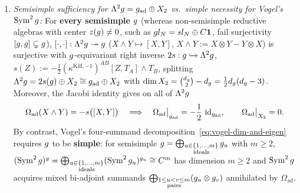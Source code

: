 \begin{proposition}[{Proof of $C_2(V\otimes W) = C_2(V)\otimes\id + \id\otimes C_2(W) + 2\Omega_{V\otimes W}$, semisimple vs.\ simple hypotheses on $X_2$, and Jacobi vanishing $\Omega_{\mathrm{ad}}|_{X_2} = 0$}]
\begin{enumerate}[label=(\arabic*),leftmargin=*]
  \item \emph{Semisimple sufficiency for $\Lambda^2g = g_{\mathrm{ad}}\oplus X_2$ vs.\ simple necessity for Vogel's $\operatorname{Sym}^2g$:} For \textbf{every semisimple} $g$ (whereas non-semisimple reductive algebras with center $z(g) \neq 0$, such as $gl_N = sl_N\oplus C\mathbf{1}$, fail surjectivity $[g,g]\subsetneq g$), $[\cdot,\cdot] : \Lambda^2g \twoheadrightarrow g$ ($X\wedge Y \mapsto [X,Y]$, $X\wedge Y := X\otimes Y - Y\otimes X$) is surjective with $g$-equivariant right inverse $2s : g \hookrightarrow \Lambda^2g$, $s(Z) := -\frac{1}{2}(\kappa^{\mathrm{Kill},-1})^{AB}[Z,T_A]\wedge T_B$, splitting $\Lambda^2g = 2s(g)\oplus X_2 \cong g_{\mathrm{ad}}\oplus X_2$ with $\dim X_2 = \binom{d_{g}}{2} - d_{g} = \frac{1}{2}d_{g}(d_{g}-3)$. Moreover, the Jacobi identity gives on all of $\Lambda^2g$
  \begin{equation}
  \label{eq:omega-on-wedge2}
  \Omega_{\mathrm{ad}}(X\wedge Y) = -s\bigl([X,Y]\bigr)
  \quad\Longrightarrow\quad
  \Omega_{\mathrm{ad}}\big|_{g_{\mathrm{ad}}} = -\frac{1}{2}\,\operatorname{id}_{g_{\mathrm{ad}}},\qquad
  \Omega_{\mathrm{ad}}\big|_{X_2} = 0.
  \end{equation}
  By contrast, Vogel's four-summand decomposition~\eqref{eq:vogel-dim-and-eigen} requires $g$ to be \textbf{simple}: for semisimple $g = \bigoplus_{\substack{u\in\{1,\dots,m\}\\\mathrm{ideals}}}g_u$ with $m \ge 2$, $(\operatorname{Sym}^2g)^{g} = \bigoplus_{\substack{u\in\{1,\dots,m\}\\\mathrm{ideals}}}(\operatorname{Sym}^2g_u)^{g_u} \cong C^m$ has dimension $m \ge 2$ and $\operatorname{Sym}^2g$ acquires mixed bi-adjoint summands $\bigoplus_{\substack{1\le u < v \le m\\\mathrm{pairs}}}(g_u\otimes g_v)$ annihilated by $\Omega_{\mathrm{ad}}$.
\end{enumerate}
\end{proposition}

